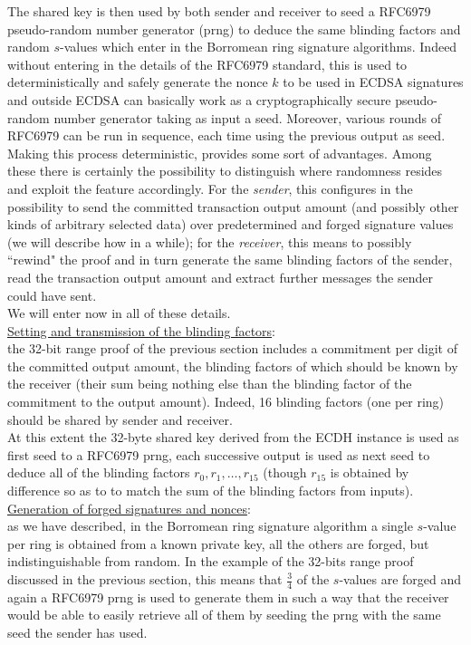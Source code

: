The shared key is then used by both sender and receiver to seed a RFC6979 \cite{rfc6979} pseudo-random number generator (prng) to deduce the same blinding factors and random $s$-values which enter in the Borromean ring signature algorithms. Indeed without entering in the details of the RFC6979 standard, this is used to deterministically and safely generate the nonce $k$ to be used in ECDSA signatures and outside ECDSA can basically work as a cryptographically secure pseudo-random number generator taking as input a seed. Moreover, various rounds of RFC6979 can be run in sequence, each time using the previous output as seed.\\
Making this process deterministic, provides some sort of advantages. Among these there is certainly the possibility to distinguish where randomness resides and exploit the feature accordingly. For the \textit{sender}, this configures in the possibility to send the committed transaction output amount (and possibly other kinds of arbitrary selected data) over predetermined and forged signature values (we will describe how in a while); for the \textit{receiver}, this means to possibly ``rewind" the proof and in turn generate the same blinding factors of the sender, read the transaction output amount and extract further messages the sender could have sent.\\
We will enter now in all of these details.\\
\underline{Setting and transmission of the blinding factors}:\\
the 32-bit range proof of the previous section includes a commitment per digit of the committed output amount, the blinding factors of which should be known by the receiver (their sum being nothing else than the blinding factor of the commitment to the output amount). Indeed, 16 blinding factors (one per ring) should be shared by sender and receiver.\\ 
At this extent the 32-byte shared key derived from the ECDH instance is used as first seed to a RFC6979 prng, each successive output is used as next seed to deduce all of the blinding factors $r_0, r_1, \dots, r_{15}$ (though $r_{15}$ is obtained by difference so as to to match the sum of the blinding factors from inputs).\\
\underline{Generation of forged signatures and nonces}:\\
as we have described, in the Borromean ring signature algorithm a single $s$-value per ring is obtained from a known private key, all the others are forged, but indistinguishable from random. In the example of the 32-bits range proof discussed in the previous section, this means that $\frac{3}{4}$ of the $s$-values are forged and again a RFC6979 prng is used to generate them in such a way that the receiver would be able to easily retrieve all of them by seeding the prng with the same seed the sender has used. \\
